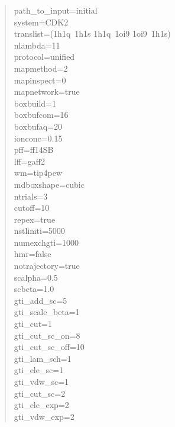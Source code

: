 \documentclass[11pt,letterpaper,titlepage]{article}
\newenvironment{itquote}
  {\begin{quote}\itshape}
  {\end{quote}\ignorespacesafterend}
\begin{document}
\vspace{1cm}
\begin{itquote}
	
{\color{blue}
	
path\_to\_input=initial 			\\
system=CDK2 					\\

translist=(1h1q~1h1s 1h1q~1oi9 1oi9~1h1s) 	\\
nlambda=11  					\\
protocol=unified 				\\

mapmethod=2 					\\
mapinspect=0 					\\
mapnetwork=true 				\\

boxbuild=1 					\\
boxbufcom=16  		 			\\
boxbufaq=20		 			\\
ionconc=0.15		 			\\
pff=ff14SB					\\
lff=gaff2					\\
wm=tip4pew					\\
mdboxshape=cubic				\\

ntrials=3					\\

cutoff=10               			\\
repex=true 					\\
nstlimti=5000           			\\
numexchgti=1000         			\\
hmr=false 					\\
notrajectory=true				\\

scalpha=0.5             			\\
scbeta=1.0              			\\
gti\_add\_sc=5 					\\
gti\_scale\_beta=1      			\\
gti\_cut=1              			\\
gti\_cut\_sc\_on=8      			\\
gti\_cut\_sc\_off=10    			\\
gti\_lam\_sch=1         			\\
gti\_ele\_sc=1          			\\
gti\_vdw\_sc=1          			\\
gti\_cut\_sc=2          			\\
gti\_ele\_exp=2         			\\
gti\_vdw\_exp=2         			\\

}
\end{itquote}
\end{document}
